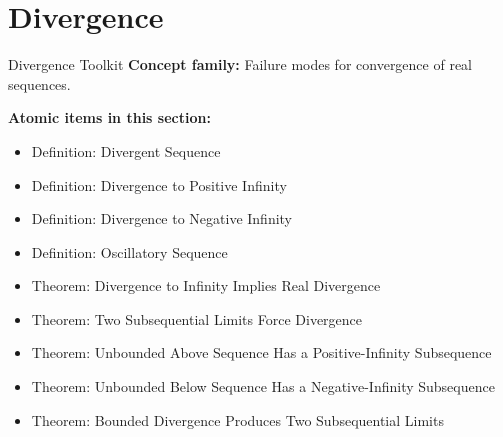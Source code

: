 \section{Divergence}

\begin{toolkitbox}{Divergence Toolkit}
\textbf{Concept family:} Failure modes for convergence of real sequences.

\medskip
\textbf{Atomic items in this section:}
\begin{itemize}
  \item Definition: Divergent Sequence
  \item Definition: Divergence to Positive Infinity
  \item Definition: Divergence to Negative Infinity
  \item Definition: Oscillatory Sequence
  \item Theorem: Divergence to Infinity Implies Real Divergence
  \item Theorem: Two Subsequential Limits Force Divergence
  \item Theorem: Unbounded Above Sequence Has a Positive-Infinity Subsequence
  \item Theorem: Unbounded Below Sequence Has a Negative-Infinity Subsequence
  \item Theorem: Bounded Divergence Produces Two Subsequential Limits
\end{itemize}
\end{toolkitbox}


